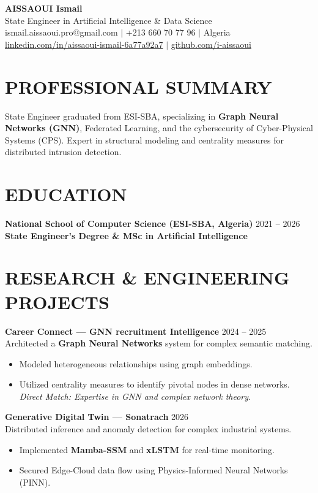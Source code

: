 \documentclass[a4paper,11pt]{article}
\begin{document}
\begin{center}
    {\Huge\bfseries\color{titleblue} AISSAOUI Ismail}\\[4pt]
    {\Large State Engineer in Artificial Intelligence \& Data Science}\\[6pt]
    ismail.aissaoui.pro@gmail.com $|$ +213 660 70 77 96 $|$ Algeria \\
    \href{https://linkedin.com/in/aissaoui-ismail-6a77a92a7}{linkedin.com/in/aissaoui-ismail-6a77a92a7} $|$ \href{https://github.com/i-aissaoui}{github.com/i-aissaoui}
\end{center}

\section{PROFESSIONAL SUMMARY}
State Engineer graduated from ESI-SBA, specializing in \textbf{Graph Neural Networks (GNN)}, Federated Learning, and the cybersecurity of Cyber-Physical Systems (CPS). Expert in structural modeling and centrality measures for distributed intrusion detection.

\section{EDUCATION}
\textbf{National School of Computer Science (ESI-SBA, Algeria)} \hfill 2021 -- 2026 \\
\textbf{State Engineer's Degree \& MSc in Artificial Intelligence}

\section{RESEARCH & ENGINEERING PROJECTS}

\textbf{Career Connect — GNN recruitment Intelligence} \hfill 2024 -- 2025 \\
Architected a \textbf{Graph Neural Networks} system for complex semantic matching.
\begin{itemize}
    \item Modeled heterogeneous relationships using graph embeddings.
    \item Utilized centrality measures to identify pivotal nodes in dense networks.
    \textit{Direct Match: Expertise in GNN and complex network theory.}
\end{itemize}

\textbf{Generative Digital Twin — Sonatrach} \hfill 2026 \\
Distributed inference and anomaly detection for complex industrial systems.
\begin{itemize}
    \item Implemented \textbf{Mamba-SSM} and \textbf{xLSTM} for real-time monitoring.
    \item Secured Edge-Cloud data flow using Physics-Informed Neural Networks (PINN).
\end{itemize}
\end{document}
